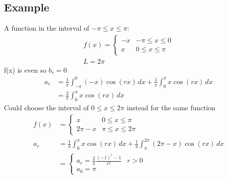 \documentclass[a4paper, 11pt, normalem]{report}
\begin{document}
\subsection{Example}
A function in the interval of $-\pi \leq x \leq \pi$:
\begin{gather*}
    f(x) =  \begin{cases}
                -x & -\pi \leq x \leq 0 \\
                x & 0 \leq x \leq \pi
            \end{cases} \\
    L = 2\pi
\end{gather*}
f(x) is even so $b_r = 0$
\begin{align*}
    a_r &= \frac{1}{\pi} \int_{-\pi}^{0} (-x)\cos(rx) \, dx + \frac{1}{\pi} \int_{0}^{\pi} x\cos(rx) \, dx \\
    & = \frac{2}{\pi} \int_{0}^{\pi} x\cos(rx) \, dx
\end{align*}
Could choose the interval of $0 \leq x \leq 2\pi$ instead for the same function
\begin{align*}
    f(x) &= \begin{cases}
                x & 0 \leq x \leq \pi \\
                2\pi - x & \pi \leq x \leq 2\pi
            \end{cases} \\
    a_r &= \frac{1}{\pi} \int_{0}^{\pi} x\cos(rx) \, dx + \frac{1}{\pi} \int_{\pi}^{2\pi} (2\pi - x)\cos(rx) \, dx \\
    &=
    \begin{cases}
        a_r = \frac{2}{\pi} \frac{(-1)^r - 1}{r^2} & r > 0 \\
        a_0 = \pi &
    \end{cases}
\end{align*}
\end{document}
